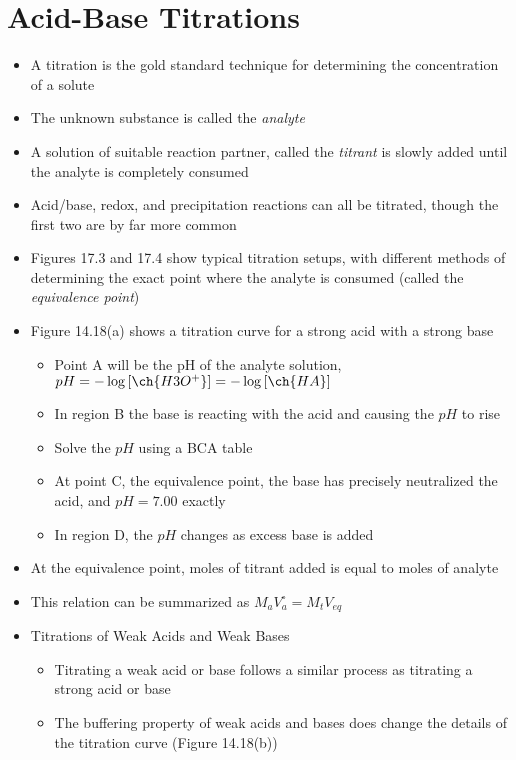\documentclass[12pt, openany, letterpaper]{memoir}
\begin{document}
\section{Acid-Base Titrations}
\begin{itemize}
  \item A titration is the gold standard technique for determining the concentration of a solute
	\item The unknown substance is called the \emph{analyte}
	\item A solution of suitable reaction partner, called the \emph{titrant} is slowly added until the analyte is completely consumed
	\item Acid/base, redox, and precipitation reactions can all be titrated, though the first two are by far more common
	\item Figures 17.3 and 17.4 show typical titration setups, with different methods of determining the exact point where the analyte is consumed (called the \emph{equivalence point})
	\item Figure 14.18(a) shows a titration curve for a strong acid with a strong base
	\begin{itemize}
		\item Point A will be the pH of the analyte solution, $pH=-\log\left[\ch{H3O^+}\right]=-\log\left[\ch{HA}\right]$
		\item In region B the base is reacting with the acid and causing the $pH$ to rise
		\item Solve the $pH$ using a BCA table
		\item At point C, the equivalence point, the base has precisely neutralized the acid, and $pH=7.00$ exactly
		\item In region D, the $pH$ changes as excess base is added
	\end{itemize}
	\item At the equivalence point, moles of titrant added is equal to moles of analyte
	\item This relation can be summarized as $M_aV^\circ_a=M_tV_{eq}$
  \item Titrations of Weak Acids and Weak Bases
  \begin{itemize}
    \item Titrating a weak acid or base follows a similar process as titrating a strong acid or base
    \item The buffering property of weak acids and bases does change the details of the titration curve (Figure 14.18(b))
    \begin{itemize}

\end{itemize}
\end{itemize}
\end{itemize}
\end{document}
